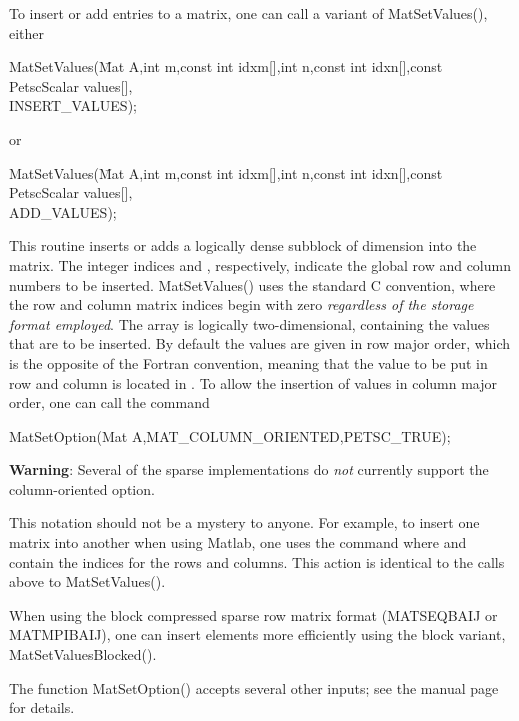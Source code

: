 To insert or add entries to a matrix, one can call a variant of MatSetValues(), either
\begin{tabbing}
  MatSetValues(\=Mat A,int m,const int idxm[],int n,const int idxn[],const PetscScalar values[],\\
            \>INSERT_VALUES);
\end{tabbing}
or 
\begin{tabbing}
  MatSetValues(\=Mat A,int m,const int idxm[],int n,const int idxn[],const PetscScalar values[],\\
            \>ADD_VALUES);
\end{tabbing}
This routine inserts or adds a logically dense subblock of dimension
 into the 
matrix. The integer indices  and , respectively, indicate the 
global row and column numbers to be inserted.  MatSetValues() uses the 
standard C convention, where the row and column matrix indices begin with 
zero {\em regardless of the storage format employed}.   The array 
 is logically two-dimensional, containing the values that are 
to be inserted. By default the values are given in row major order, which is the
opposite of the Fortran convention, meaning that the value to be put in row
 and column  is located in . To
allow the insertion of values in column major order, one can call the command
\begin{tabbing}
  MatSetOption(Mat A,MAT\_COLUMN\_ORIENTED,PETSC_TRUE);
\end{tabbing}
{\bf Warning}: Several of the sparse implementations do {\em not} currently
support the column-oriented option.

This notation should not be a mystery to anyone. For example, 
to insert one matrix into another when using Matlab, one uses the command 
 where  and  contain the indices for the
rows and columns. This action is identical to the calls above to 
MatSetValues().

When using the block compressed sparse row matrix format (MATSEQBAIJ or
MATMPIBAIJ), one can insert elements more efficiently using the block
variant, MatSetValuesBlocked().

The function MatSetOption() accepts several other inputs; see
the manual page for details.

